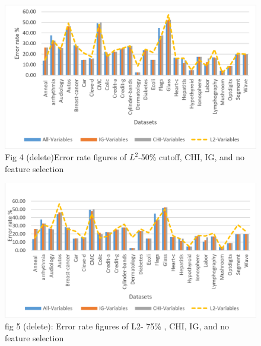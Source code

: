 \documentclass[review]{elsarticle}
\begin{document}
\begin{figure}[h]
	\centering
	\includegraphics[width=0.8\linewidth]{figs/fig_4_error_rt_50.png}
	\caption[fig-4-error-rt-50]{ Fig 4 (delete)Error rate figures of $ L^2 $-50\% cutoff, CHI, IG, and no feature selection }
	\label{fig:fig-4-error-rt-50}
\end{figure}



\begin{figure}[h]
	\centering
	\includegraphics[width=0.8\linewidth]{figs/fig_5_error_rt_75.png}
	\caption[fig-5-error-rt-75]{ fig 5 (delete): Error rate figures of L2- 75\% , CHI, IG, and no feature selection  }
	\label{fig:fig_5_error_rt_75}
\end{figure}
\end{document}
